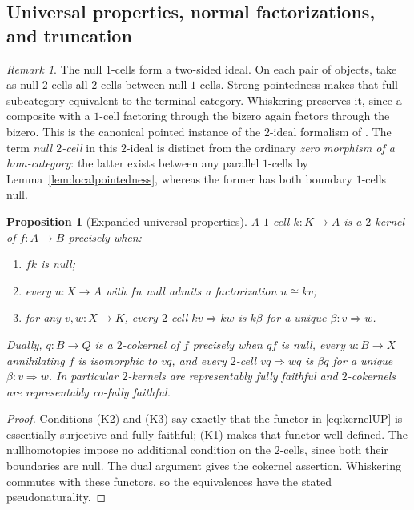 \documentclass[11pt,reqno,a4paper]{amsart}
\newtheorem{proposition}[theorem]{Proposition}
\theoremstyle{definition}
\theoremstyle{remark}
\newtheorem{remark}[theorem]{Remark}
\newcommand{\0}{\mathbf{0}}
\renewcommand{\1}{\mathbf{1}}
\begin{document}
\subsection{Universal properties, normal factorizations, and truncation}

\begin{remark}\label{remcanonical2ideal}
The null $1$-cells form a two-sided ideal. On each pair of objects, take
as null $2$-cells all $2$-cells between null $1$-cells. Strong pointedness
makes that full subcategory equivalent to the terminal category. Whiskering
preserves it, since a composite with a $1$-cell factoring through the bizero
again factors through the bizero. This is the canonical pointed instance
of the $2$-ideal formalism of \cite[Section 2]{CJM}. The term
\emph{null $2$-cell} in this $2$-ideal is distinct from the ordinary
\emph{zero morphism of a hom-category}: the latter exists between
any parallel $1$-cells by Lemma~\ref{lem:localpointedness}, whereas
the former has both boundary $1$-cells null.
\end{remark}

\begin{proposition}[Expanded universal properties]\label{prop:expanded-up}
A $1$-cell $k:K\to A$ is a $2$-kernel of $f:A\to B$ precisely when:
\begin{enumerate}[label=\textup{(K\arabic*)},leftmargin=16mm]
\item $fk$ is null;
\item every $u:X\to A$ with $fu$ null admits a factorization
$u\cong kv$;
\item for any $v,w:X\to K$, every $2$-cell $kv\Rightarrow kw$ is
$k\beta$ for a unique $\beta:v\Rightarrow w$.
\end{enumerate}
Dually, $q:B\to Q$ is a $2$-cokernel of $f$ precisely when $qf$ is null,
every $u:B\to X$ annihilating $f$ is isomorphic to $vq$, and every
$2$-cell $vq\Rightarrow wq$ is $\beta q$ for a unique $\beta:v\Rightarrow w$.
In particular $2$-kernels are representably fully faithful and
$2$-cokernels are representably co-fully faithful.
\end{proposition}
\begin{proof}
Conditions (K2) and (K3) say exactly that the functor in
\eqref{eq:kernelUP} is essentially surjective and fully faithful;
(K1) makes that functor well-defined. The nullhomotopies impose no
additional condition on the $2$-cells, since both their boundaries are
null. The dual argument gives the cokernel assertion. Whiskering
commutes with these functors, so the equivalences have the stated
pseudonaturality.
\end{proof}
\end{document}
